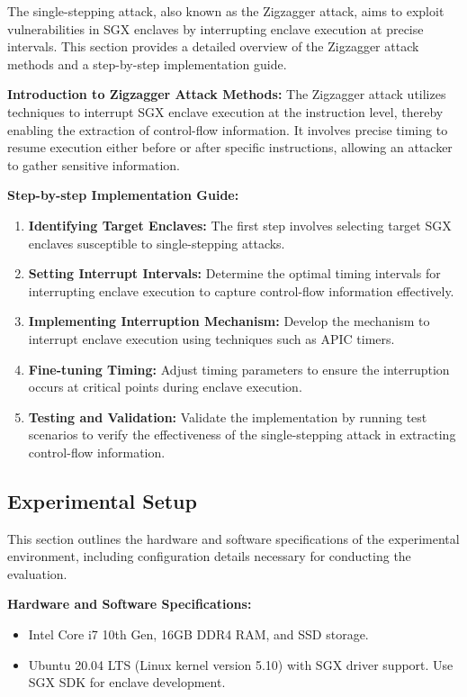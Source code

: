 \documentclass{llncs}
\begin{document}
The single-stepping attack, also known as the Zigzagger attack,
aims to exploit vulnerabilities in SGX enclaves
by interrupting enclave execution at precise intervals.
This section provides a detailed overview of the Zigzagger attack methods and a step-by-step implementation guide.

\textbf{Introduction to Zigzagger Attack Methods:}
The Zigzagger attack utilizes techniques to interrupt SGX enclave execution at the instruction level,
thereby enabling the extraction of control-flow information.
It involves precise timing to resume execution either before or after specific instructions,
allowing an attacker to gather sensitive information.

\textbf{Step-by-step Implementation Guide:}
\begin{enumerate}
  \item \textbf{Identifying Target Enclaves:} The first step involves selecting target SGX enclaves susceptible to single-stepping attacks.
  \item \textbf{Setting Interrupt Intervals:} Determine the optimal timing intervals for interrupting enclave execution to capture control-flow information effectively.
  \item \textbf{Implementing Interruption Mechanism:} Develop the mechanism to interrupt enclave execution using techniques such as APIC timers.
  \item \textbf{Fine-tuning Timing:} Adjust timing parameters to ensure the interruption occurs at critical points during enclave execution.
  \item \textbf{Testing and Validation:} Validate the implementation by running test scenarios to verify the effectiveness of the single-stepping attack in extracting control-flow information.
\end{enumerate}

\subsection{Experimental Setup}

This section outlines the hardware and software specifications of the experimental environment, including configuration details necessary for conducting the evaluation.

\textbf{Hardware and Software Specifications:}
\begin{itemize}
  \item Intel Core i7 10th Gen, 16GB DDR4 RAM, and SSD storage.
  \item Ubuntu 20.04 LTS (Linux kernel version 5.10) with SGX driver support. Use SGX SDK for enclave development.
\end{itemize}
\end{document}
